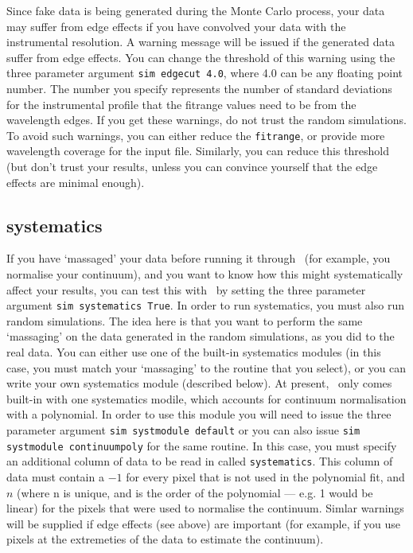 Since fake data is being generated during the Monte Carlo process, your
data may suffer from edge effects if you have convolved your data with the
instrumental resolution. A warning message will be issued if the generated
data suffer from edge effects. You can change the threshold of this warning
using the three parameter argument \texttt{sim edgecut 4.0}, where 4.0 can
be any floating point number. The number you specify represents the number
of standard deviations for the instrumental profile that the fitrange values
need to be from the wavelength edges. If you get these warnings, do not
trust the random simulations. To avoid such warnings, you can either reduce
the \texttt{fitrange}, or provide more wavelength coverage for the input file.
Similarly, you can reduce this threshold (but don't trust your results, unless
you can convince yourself that the edge effects are minimal enough).

\subsection{systematics}

If you have `massaged' your data before running it through \alis\
(for example, you normalise your continuum), and you want to know
how this might systematically affect your results, you can test this with
\alis\ by setting the three parameter argument \texttt{sim systematics True}.
In order to run systematics, you must also run random simulations. The idea
here is that you want to perform the same `massaging' on the data generated
in the random simulations, as you did to the real data. You can either use one
of the built-in systematics modules (in this case, you must match your `massaging'
to the routine that you select), or you can write your own systematics module
(described below). At present, \alis\ only comes built-in with one systematics
modile, which accounts for continuum normalisation with a polynomial.
In order to use this module you will need to issue the three parameter argument
\texttt{sim systmodule default} or you can also issue
\texttt{sim systmodule continuumpoly} for the same routine.
In this case, you must specify an additional column of data to be read in
called \texttt{systematics}. This column of data must contain a $-1$ for every
pixel that is not used in the polynomial fit, and $n$ (where n is unique, and is
the order of the polynomial --- e.g. 1 would be linear) for the pixels that were
used to normalise the continuum. Simlar warnings will be supplied if edge
effects (see above) are important (for example, if you use pixels at the
extremeties of the data to estimate the continuum).


